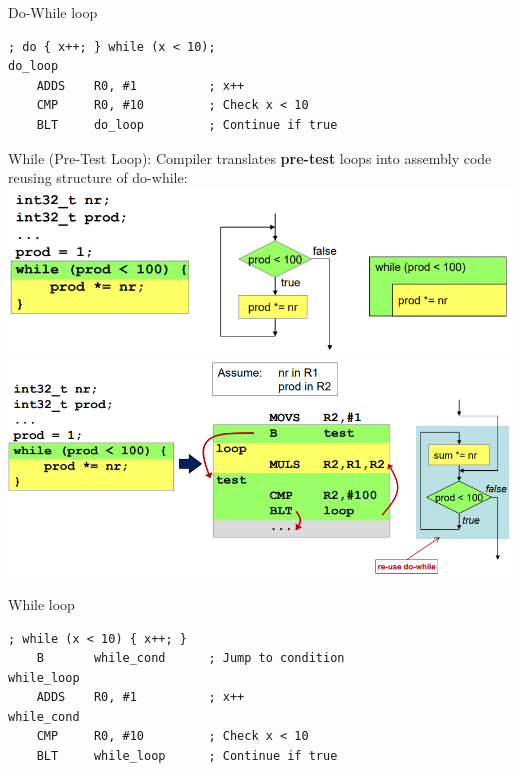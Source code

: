 \begin{KR}{Do-While loop}
\begin{lstlisting}[language=armasm, style=basesmol]
    ; do { x++; } while (x < 10);
do_loop
    ADDS    R0, #1          ; x++
    CMP     R0, #10         ; Check x < 10
    BLT     do_loop         ; Continue if true
\end{lstlisting}
\end{KR}

\begin{concept}{While (Pre-Test Loop)}:
Compiler translates \textbf{pre-test} loops into assembly code reusing structure of do-while:\\
\includegraphics[width=\linewidth]{images/whileloop.png}\\
\includegraphics[width=\linewidth]{images/whileloop2.png}
\end{concept}

\begin{KR}{While loop}
\begin{lstlisting}[language=armasm, style=basesmol]
    ; while (x < 10) { x++; }
    B       while_cond      ; Jump to condition
while_loop
    ADDS    R0, #1          ; x++
while_cond
    CMP     R0, #10         ; Check x < 10
    BLT     while_loop      ; Continue if true
\end{lstlisting}
\end{KR}

